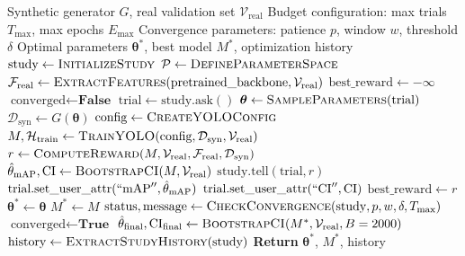 \begin{algorithm}[H]
\caption{Complete BOHB Optimization Campaign}
\label{alg:bohb_complete}
\begin{algorithmic}[1]
\Require Synthetic generator $G$, real validation set $\mathcal{V}_{\text{real}}$
\Require Budget configuration: max trials $T_{\max}$, max epochs $E_{\max}$
\Require Convergence parameters: patience $p$, window $w$, threshold $\delta$
\Ensure Optimal parameters $\boldsymbol{\theta}^*$, best model $M^*$, optimization history
\State {}
\State $\text{study} \gets \Call{InitializeStudy}{}$ 
\State $\mathcal{P} \gets \Call{DefineParameterSpace}{}$ 
\State $\mathcal{F}_{\text{real}} \gets \Call{ExtractFeatures}{\text{pretrained\_backbone}, \mathcal{V}_{\text{real}}}$
\State $\text{best\_reward} \gets -\infty$
\State $\text{converged} \gets \textbf{False}$
\State {}
    \State {}
    \State $\text{trial} \gets \text{study}.\text{ask}()$
    \State $\boldsymbol{\theta} \gets \Call{SampleParameters}{\text{trial}}$ 
    \State $\mathcal{D}_{\text{syn}} \gets G(\boldsymbol{\theta})$
    \State $\text{config} \gets \Call{CreateYOLOConfig}{}$ 
    \State $M, \mathcal{H}_{\text{train}} \gets \Call{TrainYOLO}{\text{config}, \mathcal{D}_{\text{syn}}, \mathcal{V}_{\text{real}}}$
    \State $r \gets \Call{ComputeReward}{M, \mathcal{V}_{\text{real}}, \mathcal{F}_{\text{real}}, \mathcal{D}_{\text{syn}}}$ 
    \State $\hat{\theta}_{\text{mAP}}, \text{CI} \gets \Call{BootstrapCI}{M, \mathcal{V}_{\text{real}}}$ 
    \State {}
    \State $\text{study}.\text{tell}(\text{trial}, r)$
    \State $\text{trial}.\text{set\_user\_attr}(``\text{mAP}'', \hat{\theta}_{\text{mAP}})$
    \State $\text{trial}.\text{set\_user\_attr}(``\text{CI}'', \text{CI})$
    \State {}
        \State $\text{best\_reward} \gets r$
        \State $\boldsymbol{\theta}^* \gets \boldsymbol{\theta}$
        \State $M^* \gets M$
    \EndIf
    \State {}
    \State $\text{status}, \text{message} \gets \Call{CheckConvergence}{\text{study}, p, w, \delta, T_{\max}}$
        \State $\text{converged} \gets \textbf{True}$
        \State {}
    \EndIf
\EndWhile
\State {}
\State $\hat{\theta}_{\text{final}}, \text{CI}_{\text{final}} \gets \Call{BootstrapCI}{M^*, \mathcal{V}_{\text{real}}, B=2000}$
\State $\text{history} \gets \Call{ExtractStudyHistory}{\text{study}}$
\State \textbf{Return} $\boldsymbol{\theta}^*$, $M^*$, history
\end{algorithmic}
\end{algorithm}

